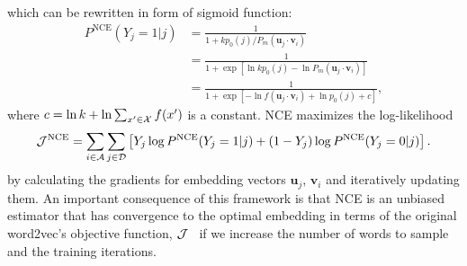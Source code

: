 \documentclass[12pt,a4paper]{article}
\newcommand{\vect}[1]{\boldsymbol{#1}}
\begin{document}
which can be rewritten in form of sigmoid function:
\begin{align}
	\label{eq:nce}
	P^{\text{NCE}}\left(Y_{j}=1 \vert j\right)
	 & = \frac{
		1
	}{
		1 + kp_0(j) / P_m(\vect{u}_j \cdot \vect{v}_{i})
	}           \\
	 & = \frac{
		1
	}{
		1 + \exp\left[ \ln kp_0(j) - \ln P_m(\vect{u}_j \cdot \vect{v}_{i}) \right]
	}           \\
	 & = \frac{
		1
	}{
		1 + \exp\left[ - \ln f(\vect{u}_j \cdot \vect{v}_{i})  + \ln p_0(j) + c \right]
	},
\end{align}
where $c = \ln k + \ln\sum_{ x' \in {\cal X}} f(x') $ is a constant.
NCE maximizes the log-likelihood
\begin{align}
	\label{eq:log-likelihood-logistic-regress}
	{\cal J}^{\text{NCE}} = \sum_{i \in {\cal A}}\sum_{j \in {\cal D}} \left[ Y_{j} \log P^{\text{NCE}}(Y_{j} = 1\vert j) + (1-Y_{j}) \log P^{\text{NCE}}(Y_{j} = 0 \vert j)\right].
\end{align}
by calculating the gradients for embedding vectors $\vect{u}_j$, $\vect{v}_{i}$ and iteratively updating them.
An important consequence of this framework is that NCE is an unbiased estimator that has convergence to the optimal embedding in terms of the original word2vec's objective function, ${\cal J}$~\autocite{Chia2010,Dyer2014} if we increase the number of words to sample and the training iterations.
\end{document}

